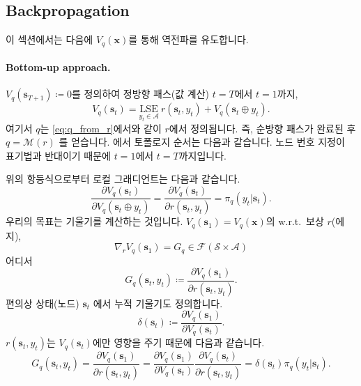 \documentclass{article}
\def\s{{\bm{s}}}
\def\x{{\bm{x}}}
\def\cA{{\mathcal{A}}}
\def\cF{{\mathcal{F}}}
\def\cM{{\mathcal{M}}}
\def\cS{{\mathcal{S}}}
\def\lse{{\mathrm{LSE}}}
\def\augvoc{\cA}
\def\wrt{{w.r.t.\ }}
\begin{document}
\subsection{Backpropagation} 
 \label{sec:backpropagation}

이 섹션에서는 \citet{mensch2018differentiable} 다음에 $V_q(\x)$를 통해 역전파를 유도합니다.

\paragraph{Bottom-up approach.}

$V_q(\s_{T+1}) \coloneqq 0$를 정의하여 정방향 패스(값
계산) $t=T$에서 $t=1$까지,
 \begin{equation} 
V_q( \s _{t}) 
= \underset{y_t \in \augvoc} { \lse } ~ r( \s _t, y_t) + V_q( \s _t \oplus y_t).
 \end{equation} 
여기서 $q$는 \eqref{eq:q_from_r}에서와 같이 $r$에서 정의됩니다.
즉, 순방향 패스가 완료된 후 $q = \cM(r)$ 를 얻습니다.
\citet{mensch2018differentiable} 에서 토폴로지 순서는 다음과 같습니다.
노드 번호 지정이 표기법과 반대이기 때문에 $t=1$에서 $t=T$까지입니다.

위의 항등식으로부터 로컬 그래디언트는 다음과 같습니다.
 \begin{equation} 
 \frac{\partial V_q(\s_t)} { \partial V_q( \s _t \oplus y_t)}
= \frac{\partial V_q(\s_t)} { \partial r( \s _t, y_t)} 
= \pi _q(y_t| \s _t).
 \end{equation} 
우리의 목표는 기울기를 계산하는 것입니다.
$V_q(\s_1) = V_q(\x)$의 
 \wrt 보상 $r$(에지),
 \begin{equation} 
 \nabla _r V_q( \s _1) = G_q \in \cF ( \cS \times \augvoc )
 \end{equation} 
어디서
 \begin{equation} 
G_q( \s _t, y_t) \coloneqq \frac{\partial V_q(\s_1)} { \partial r( \s _t, y_t)}.
 \end{equation} 
편의상 상태(노드) $\s_t$ 에서 누적 기울기도 정의합니다.
 \begin{equation} 
 \delta ( \s _t) \coloneqq \frac{\partial V_q(\s_1)} { \partial V_q( \s _t)}. 
 \end{equation} 
$r(\s_t, y_t)$는 $V_q(\s_t)$에만 영향을 주기 때문에 다음과 같습니다.
 \begin{equation} 
G_q( \s _t, y_t) 
= \frac{\partial V_q(\s_1)} { \partial r( \s _t, y_t)} 
= \frac{\partial V_q(\s_1)} { \partial V_q( \s _t)} 
   \frac{\partial V_q(\s_t)} { \partial r( \s _t, y_t)}
= \delta ( \s _t) \pi _q(y_t| \s _t).
 \end{equation}
\end{document}

